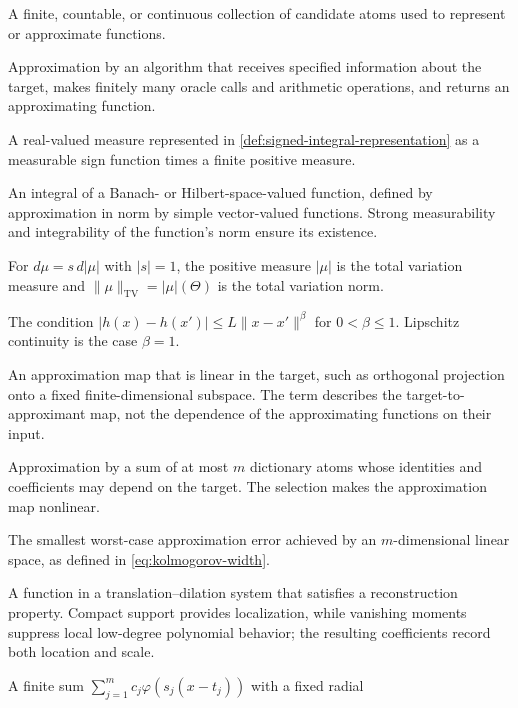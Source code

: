\documentclass[11pt,twoside]{article}
\newcommand{\TV}{\operatorname{TV}}
\theoremstyle{definition}
\theoremstyle{remark}
\begin{document}
\begin{description}[style=unboxed,leftmargin=1.5em,labelindent=0pt]
\item[Dictionary]
A finite, countable, or continuous collection of candidate atoms used to
represent or approximate functions.
\item[Constructive approximation]
Approximation by an algorithm that receives specified information about the
target, makes finitely many oracle calls and arithmetic operations, and
returns an approximating function.
\item[Signed measure]
A real-valued measure represented in
\cref{def:signed-integral-representation} as a measurable sign function times
a finite positive measure.
\item[Bochner integral]
An integral of a Banach- or Hilbert-space-valued function, defined by
approximation in norm by simple vector-valued functions. Strong measurability
and integrability of the function's norm ensure its existence.
\item[Total variation measure and norm]
For $d\mu=s\,d|\mu|$ with $|s|=1$, the positive measure $|\mu|$ is the
total variation measure and $\|\mu\|_{\TV}=|\mu|(\Theta)$ is the total
variation norm.
\item[H\"older continuity]
The condition $|h(x)-h(x')|\leq L\|x-x'\|^\beta$ for
$0<\beta\leq1$. Lipschitz continuity is the case $\beta=1$.
\item[Linear approximation method]
An approximation map that is linear in the target, such as orthogonal
projection onto a fixed finite-dimensional subspace. The term describes the
target-to-approximant map, not the dependence of the approximating functions
on their input.
\item[Nonlinear $m$-term approximation]
Approximation by a sum of at most $m$ dictionary atoms whose identities and
coefficients may depend on the target. The selection makes the approximation
map nonlinear.
\item[Kolmogorov $m$-width]
The smallest worst-case approximation error achieved by an $m$-dimensional
linear space, as defined in \cref{eq:kolmogorov-width}.
\item[Wavelet]
A function in a translation--dilation system that satisfies a reconstruction
property. Compact support provides localization, while vanishing moments
suppress local low-degree polynomial behavior; the resulting coefficients
record both location and scale.
\item[Radial-basis-function network]
A finite sum $\sum_{j=1}^m c_j\varphi(s_j(x-t_j))$ with a fixed radial

\end{description}
\end{document}
